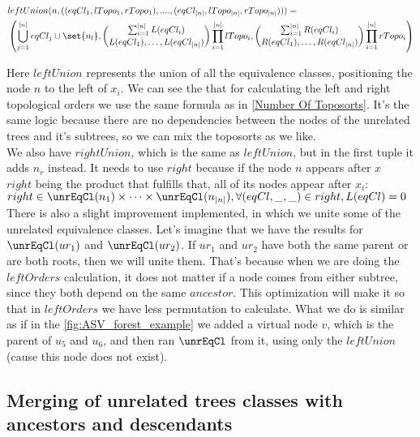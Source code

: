 
\begin{align*}
&leftUnion(n, ((eqCl_1, lTopo_1, rTopo_1), ...., (eqCl_{|n|}, lTopo_{|n|}, rTopo_{|n|}))) = \\ 
&\left(\bigcup_{j=1}^{|n|} eqCl_j \cup \set{n_l}, \binom{\sum_{i=1}^{|n|} L(eqCl_i)}{L(eqCl_1), \ldots, L(eqCl_{|n|})} \prod_{i=1}^{|n|} lTopo_i, 
\binom{\sum_{i=1}^{|n|} R(eqCl_i)}{R(eqCl_1), \ldots, R(eqCl_{|n|})} \prod_{i=1}^{|n|} rTopo_i \right)
\end{align*}

Here $leftUnion$ represents the union of all the equivalence classes, positioning the node $n$ to the left of $x_i$. We can see the that for calculating the left and right topological orders we use the same formula as in \ref{Number Of Toposorts}. It's the same logic because there are no dependencies between the nodes of the unrelated trees and it's subtrees, so we can mix the toposorts as we like. \\
We also have $rightUnion$, which is the same as $leftUnion$, but in the first tuple it adds $n_r$ instead. It needs to use $right$ because if the node $n$ appears after $x$ \\
$right$ being the product that fulfills that, all of its nodes appear after $x_i$: \\ $right \in \unrEqCl(n_1) \times \dots \times \unrEqCl(n_{|n|}),  \forall (eqCl, \_ , \_) \in right, L(eqCl)=0$ \\

\label{slight_improvement}
There is also a slight improvement implemented, in which we unite some of the unrelated equivalence classes. Let's imagine that we have the results for $\unrEqCl(ur_1)$ and $\unrEqCl(ur_2)$. If $ur_1$ and $ur_2$ have both the same parent or are both roots, then we will unite them. That's because when we are doing the $leftOrders$ calculation, it does not matter if a node comes from either subtree, since they both depend on the same $ancestor$. This optimization will make it so that in $leftOrders$ we have less permutation to calculate. What we do is similar as if in the \ref{fig:ASV_forest_example} we added a virtual node $v$, which is the parent of $u_5$ and $u_6$, and then ran $\unrEqCl$ from it, using only the $leftUnion$ (cause this node does not exist). 

\subsection{Merging of unrelated trees classes with ancestors and descendants}

